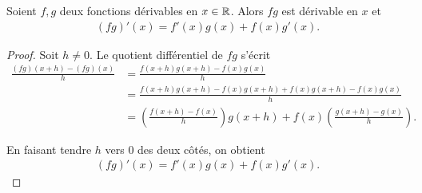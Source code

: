 \documentclass[main.tex]{subfiles}
\begin{document}
\begin{proposition}

    Soient $f, g$ deux fonctions dérivables en $x \in \mathbb{R}$.
    Alors $f g$ est dérivable en $x$ et
    \begin{align}
        (f g)'(x) = f'(x) g(x) + f(x) g'(x).
    \end{align}
\end{proposition}
\begin{proof}
    Soit $h \neq 0$.
    Le quotient différentiel de $f g$ s'écrit
    \begin{align}
        \frac {(f g)(x + h) - (f g)(x)} h
        &= \frac {f(x + h) g(x + h) - f(x) g(x)} h\\
        &= \frac {f(x + h) g(x + h) - f(x) g(x + h) + f(x) g(x + h) - f(x) g(x)} h\\
        &= \left(\frac {f(x + h) - f(x)} h\right) g(x + h) + f(x) \left(\frac {g(x + h) - g(x)} h\right).
    \end{align}

    En faisant tendre $h$ vers $0$ des deux côtés,
    on obtient
    \begin{align}
        (f g)'(x) = f'(x) g(x) + f(x) g'(x).
    \end{align}
\end{proof}
\end{document}
